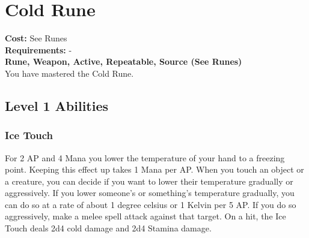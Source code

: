 \twocolumn
\section{Cold Rune}\label{rune:cold}
\textbf{Cost:} See Runes\\
\textbf{Requirements:} -\\
\textbf{Rune, Weapon, Active, Repeatable, Source (See Runes)}\\
You have mastered the Cold Rune.

\subsection{Level 1 Abilities}

\subsubsection{Ice Touch}
For 2 AP and 4 Mana you lower the temperature of your hand to a freezing point.
Keeping this effect up takes 1 Mana per AP.
When you touch an object or a creature, you can decide if you want to lower their temperature gradually or aggressively.
If you lower someone's or something's temperature gradually, you can do so at a rate of about 1 degree celsius or 1 Kelvin per 5 AP.
If you do so aggressively, make a melee spell attack against that target.
On a hit, the Ice Touch deals 2d4 cold damage and 2d4 Stamina damage.